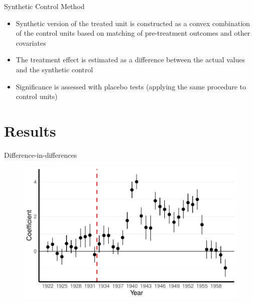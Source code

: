 \documentclass[11pt]{beamer}
\begin{document}
\begin{frame}{Synthetic Control Method}
\begin{itemize}
    \item  Synthetic version of the treated unit is constructed as a convex combination of the control units based on matching of pre-treatment outcomes and other covariates
    \item The treatment effect is estimated as a difference between the actual
     values and the synthetic control
    \item Significance is assessed with placebo tests (applying the same procedure to control units)
\end{itemize}
\end{frame}
{
\section{Results}
}
\begin{frame}{Difference-in-differences}
 \begin{figure}[h]
\centering
\includegraphics[width=\textwidth]{fmla_pred_full_imp_date_no_trends_geopol_cr2.pdf}
\label{fig:did_effets}
\end{figure}
\end{frame}
\end{document}
